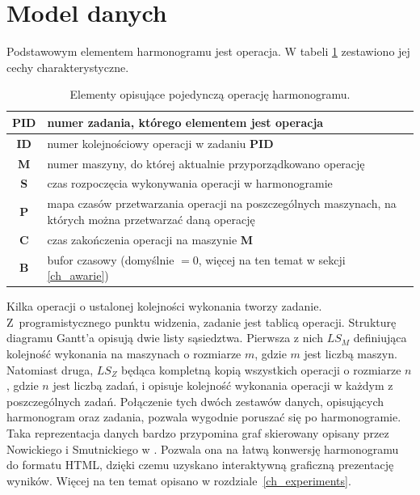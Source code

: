 \documentclass[printmode,oneside]{mgr}
\begin{document}
\section{Model danych}
Podstawowym elementem harmonogramu jest operacja. W tabeli \ref{table_operation} zestawiono jej cechy charakterystyczne.
\begin{table}[ht]
\renewcommand{\arraystretch}{1.5}
\begin{tabular}{|c|l|}
    \hline
    \textbf{PID} & numer zadania, którego elementem jest operacja\\
    \hline
    \textbf{ID} & numer kolejnościowy operacji w zadaniu \textbf{PID}\\
    \hline
    \textbf{M} & numer maszyny, do której aktualnie przyporządkowano operację\\
    \hline
    \textbf{S} & czas rozpoczęcia wykonywania operacji w harmonogramie\\
    \hline
    \textbf{P} & \multicolumn{1}{m{14.25cm}|}{mapa czasów przetwarzania operacji na poszczególnych maszynach, na których można przetwarzać daną operację}\\
    \hline
    \textbf{C} & czas zakończenia operacji na maszynie \textbf{M}\\
    \hline
    \textbf{B} & bufor czasowy (domyślnie $=0$, więcej na ten temat w sekcji \ref{ch_awarie})\\
    \hline
\end{tabular}
\renewcommand{\arraystretch}{1}
\caption{Elementy opisujące pojedynczą operację harmonogramu.}
\label{table_operation}
\end{table}
Kilka operacji o ustalonej kolejności wykonania tworzy zadanie. Z~programistycznego punktu widzenia, zadanie jest tablicą operacji. Strukturę diagramu Gantt'a opisują dwie listy sąsiedztwa. Pierwsza z nich $LS_M$ definiująca kolejność wykonania na maszynach o rozmiarze $m$, gdzie $m$ jest liczbą maszyn. Natomiast druga, $LS_Z$ będąca kompletną kopią wszystkich operacji o rozmiarze $n$, gdzie $n$ jest liczbą zadań, i opisuje kolejność wykonania operacji w każdym z poszczególnych zadań. Połączenie tych dwóch zestawów danych, opisujących harmonogram oraz zadania, pozwala wygodnie poruszać się po harmonogramie. Taka reprezentacja danych bardzo przypomina graf skierowany opisany przez Nowickiego i Smutnickiego w \cite{Smutnicki96}. Pozwala ona na łatwą konwersję harmonogramu do formatu HTML, dzięki czemu uzyskano interaktywną graficzną prezentację wyników. Więcej na ten temat opisano w rozdziale~\ref{ch_experiments}.
%
\end{document}
